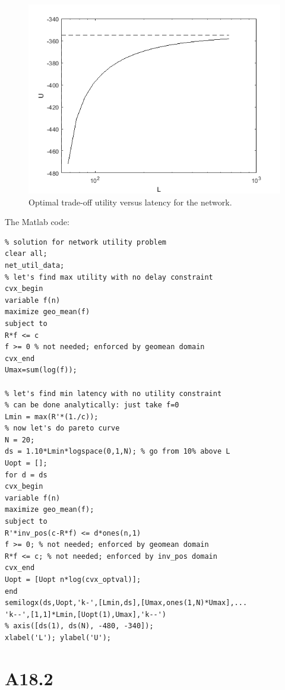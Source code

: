 \documentclass{article}
\begin{document}
\begin{figure}[H]
	\includegraphics[width=\linewidth]{A16_3_plot.png}
	\caption{Optimal trade-off utility versus latency for the network.}
	\label{fig:A16_3_plot}
\end{figure}

The Matlab code:
\begin{verbatim}
% solution for network utility problem
clear all;
net_util_data;
% let's find max utility with no delay constraint
cvx_begin
variable f(n)
maximize geo_mean(f)
subject to
R*f <= c
f >= 0 % not needed; enforced by geomean domain
cvx_end
Umax=sum(log(f));

% let's find min latency with no utility constraint
% can be done analytically: just take f=0
Lmin = max(R'*(1./c));
% now let's do pareto curve
N = 20;
ds = 1.10*Lmin*logspace(0,1,N); % go from 10% above L
Uopt = [];
for d = ds
cvx_begin
variable f(n)
maximize geo_mean(f);
subject to
R'*inv_pos(c-R*f) <= d*ones(n,1)
f >= 0; % not needed; enforced by geomean domain
R*f <= c; % not needed; enforced by inv_pos domain
cvx_end
Uopt = [Uopt n*log(cvx_optval)];
end
semilogx(ds,Uopt,'k-',[Lmin,ds],[Umax,ones(1,N)*Umax],...
'k--',[1,1]*Lmin,[Uopt(1),Umax],'k--')
% axis([ds(1), ds(N), -480, -340]);
xlabel('L'); ylabel('U');	
\end{verbatim}	

\section*{A18.2}
\end{document}
